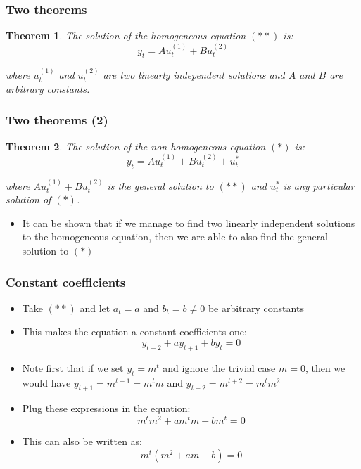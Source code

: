 \documentclass[10pt,usenames,dvipsnames]{beamer}
\theoremstyle{plain}
\newtheorem{thm}{Theorem}
\theoremstyle{definition}
\begin{document}
\begin{frame}[fragile]
\frametitle{Two theorems}
\begin{thm}
	The solution of the homogeneous equation $(**)$ is:
	\[
		y_{t} = Au_{t}^{(1)} + Bu_{t}^{(2)}
	\]
	
	where $u_{t}^{(1)}$ and $u_{t}^{(2)}$ are two linearly independent solutions and $A$ and $B$ are arbitrary constants.
\end{thm}
\end{frame}

\begin{frame}[fragile]
\frametitle{Two theorems (2)}
\begin{thm}
	The solution of the non-homogeneous equation $(*)$ is:
	\[
		y_{t} = Au_{t}^{(1)} + Bu_{t}^{(2)} + u_{t}^{*}
	\]
	
	where $Au_{t}^{(1)} + Bu_{t}^{(2)}$ is the general solution to $(**)$ and $u_{t}^{*}$ is any particular solution of $(*)$.
\end{thm}

\begin{itemize}
	\item It can be shown that if we manage to find two linearly independent solutions to the homogeneous equation, then we are able to also find the general solution to $(*)$
\end{itemize}
\end{frame}

\begin{frame}[fragile]
\frametitle{Constant coefficients}
\begin{itemize}
	\item Take $(**)$ and let $a_{t} = a$ and $b_{t} = b \neq 0$ be arbitrary constants
	\item This makes the equation a constant-coefficients one:
	\[
		y_{t+2} + ay_{t+1} + by_{t} = 0
	\]
	\item Note first that if we set $y_{t} = m^{t}$ and ignore the trivial case $ m=0 $, then we would have $y_{t+1} = m^{t+1} = m^{t}m$ and $y_{t+2} = m^{t+2} = m^t m^{2}$
	\item Plug these expressions in the equation:
	\[
		m^{t}m^{2} + am^{t}m + bm^{t} = 0
	\]
	\item This can also be written as:
	\[
		m^{t}(m^{2} + am + b) = 0
	\] 
\end{itemize}
\end{frame}
\end{document}
